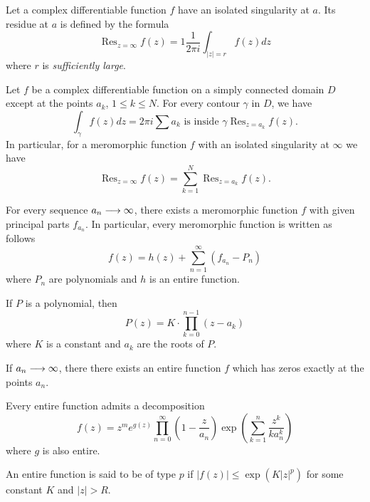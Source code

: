 \documentclass{unswmaths}
\begin{document}
\begin{definition}
	Let a complex differentiable function $ f $ have an isolated singularity at $ a $. Its residue at $ a $ is defined by the formula
	$$
		\operatorname{Res}_{z = \infty} f(z) = 1\frac{1}{2 \pi i} \int_{|z| = r} f(z) dz
	$$
	where $ r $ is \emph{sufficiently large}.
\end{definition}

\begin{theorem}
	Let $ f $ be a complex differentiable function on a simply connected domain $ D $ except at the points $ a_k $, $ 1 \leq k \leq N $. For every contour $ \gamma $ in $ D $, we have
	$$
		\int_{\gamma} f(z) dz = 2\pi i \sum{a_k \text{ is inside } \gamma} \operatorname{Res}_{z = a_k} f(z).
	$$
	In particular, for a meromorphic function $ f $ with an isolated singularity at $ \infty $ we have
	$$
		\operatorname{Res}_{z = \infty}f(z) = \sum_{k=1}^N \operatorname{Res}_{z=a_k} f(z).
	$$
\end{theorem}

\begin{theorem}
	For every sequence $ a_n \longrightarrow \infty $, there exists a meromorphic function $ f $ with given principal parts $ f_{a_n} $. In particular, every meromorphic function is written as follows
	$$
		f(z) = h(z) + \sum_{n=1}^\infty (f_{a_n} - P_n)
	$$
	where $ P_n $ are polynomials and $ h $ is an entire function.
\end{theorem}

\begin{theorem}
	If $ P $ is a polynomial, then
	$$
		P(z) = K \cdot \prod_{k=0}^{n-1} (z - a_k)
	$$
	where $ K $ is a constant and $ a_k $ are the roots of $ P $.
\end{theorem}

\begin{theorem}
	If $ a_n \longrightarrow \infty $, there there exists an entire function $ f $ which has zeros exactly at the points $ a_n $.
\end{theorem}

\begin{corollary}
	Every entire function admits a decomposition
	$$
		f(z) = z^m e^{g(z)} \prod_{n=0}^\infty \left( 1 - \frac{z}{a_n} \right)\exp\left( \sum_{k=1}^n \frac{z^k}{k a_n^k} \right)
	$$
	where $ g $ is also entire.
\end{corollary}

\begin{definition}
	An entire function is said to be of type $ p $ if $ |f(z)| \leq \exp \left( K |z|^p \right) $ for some constant $ K $ and $ |z| > R $.
\end{definition}
\end{document}

